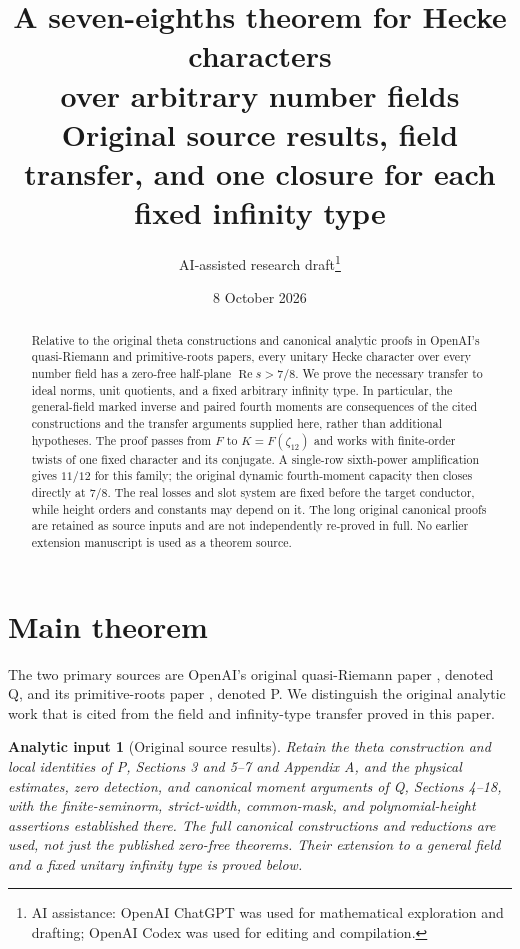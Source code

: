 \documentclass[11pt,a4paper]{article}
\title{A seven-eighths theorem for Hecke characters\\
over arbitrary number fields\\[3pt]
\large Original source results, field transfer, and one closure for each fixed infinity type}
\author{AI-assisted research draft\thanks{AI assistance: OpenAI ChatGPT was used for mathematical exploration and drafting; OpenAI Codex was used for editing and compilation.}}
\date{8 October 2026}
\newtheorem{hypothesis}[theorem]{Analytic input}
\theoremstyle{remark}\newtheorem{remark}[theorem]{Remark}
\newcommand{\Rea}{\operatorname{Re}}
\numberwithin{equation}{section}
\begin{document}
\maketitle
\begin{abstract}
Relative to the original theta constructions and canonical analytic
proofs in OpenAI's quasi-Riemann and primitive-roots papers, every
unitary Hecke character over every number field has a zero-free
half-plane $\Rea s>7/8$. We prove the necessary transfer to ideal
norms, unit quotients, and a fixed arbitrary infinity type. In
particular, the general-field marked inverse and paired fourth
moments are consequences of the cited constructions and the transfer
arguments supplied here, rather than additional hypotheses.
The proof passes from $F$ to $K=F(\zeta_{12})$ and works with
finite-order twists of one fixed character and its conjugate.
A single-row sixth-power amplification gives $11/12$ for this
family; the original dynamic fourth-moment capacity then closes
directly at $7/8$. The real losses and slot system are fixed before
the target conductor, while height orders and constants may depend
on it. The long original canonical proofs are retained as source
inputs and are not independently re-proved in full. No earlier
extension manuscript is used as a theorem source.
\end{abstract}

\section{Main theorem}

The two primary sources are OpenAI's original quasi-Riemann paper
\cite{Q}, denoted Q, and its primitive-roots paper \cite{P}, denoted P.
We distinguish the original analytic work that is cited from the
field and infinity-type transfer proved in this paper.

\begin{hypothesis}[Original source results]\label{hyp-source}
Retain the theta construction and local identities of P,
Sections 3 and 5--7 and Appendix A, and the physical estimates,
zero detection, and canonical moment arguments of Q,
Sections 4--18, with the finite-seminorm, strict-width, common-mask,
and polynomial-height assertions established there.
The full canonical constructions and reductions are used, not just
the published zero-free theorems. Their extension to a general field
and a fixed unitary infinity type is proved below.
\end{hypothesis}
\end{document}
